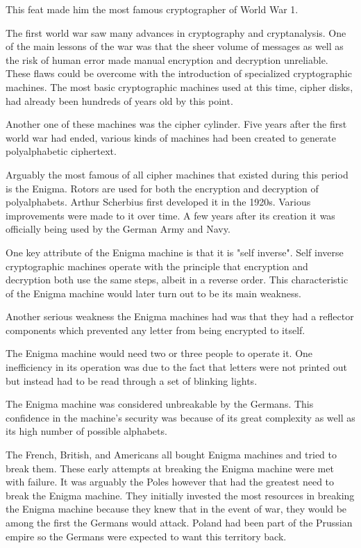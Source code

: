 \documentclass{article}
\begin{document}
    This feat made him the most famous cryptographer of World War 1.


    The first world war saw many advances in cryptography and cryptanalysis.
    One of the main lessons of the war was that the sheer volume of
    messages as well as the risk of human error made manual encryption and
    decryption unreliable. These flaws could be overcome with the
    introduction of specialized cryptographic machines.
    The most basic cryptographic machines used at this time, cipher disks,
    had already been hundreds of years old by this point.

    Another one of these machines was the cipher cylinder.
    Five years after the first world war had ended, various kinds of
    machines had been created to generate polyalphabetic ciphertext.

    Arguably the most famous of all cipher machines that existed during this
    period is the Enigma. Rotors are used for both the encryption and decryption
    of polyalphabets. Arthur Scherbius first developed it in the 1920s.
    Various improvements were made to it over time. A few years
    after its creation it was officially being used by the German Army and Navy.

    One key attribute of the Enigma machine is that it is "self inverse".
    Self inverse cryptographic machines operate with the principle
    that encryption and decryption both use the same steps, albeit
    in a reverse order.
    This characteristic of the Enigma machine would later turn out
    to be its main weakness.


    Another serious weakness the Enigma machines had was that they
    had a reflector components which prevented any letter from being
    encrypted to itself.

    The Enigma machine would need two or three people to operate it.
    One inefficiency in its operation was due to the fact that letters
    were not printed out but instead had to be read through a set of blinking lights.

    The Enigma machine was considered unbreakable by the Germans. This confidence
    in the machine's security was because of its great complexity as well
    as its high number of possible alphabets.

    The French, British, and Americans all bought Enigma machines and tried
    to break them.
    These early attempts at breaking the Enigma machine were met with failure.
    It was arguably the Poles however that had the greatest need to break the Enigma
    machine. They initially invested the most resources in breaking the Enigma machine
    because they knew that in the event of war, they would be among the first the Germans
    would attack. Poland had been part of the Prussian empire so the Germans
    were expected to want this territory back.
\end{document}
